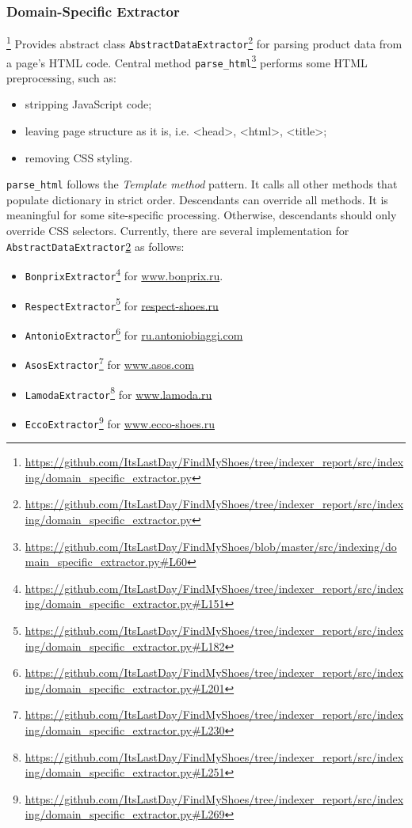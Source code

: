 \subsubsection{Domain-Specific Extractor}
    \footnote{\url{https://github.com/ItsLastDay/FindMyShoes/tree/indexer_report/src/indexing/domain_specific_extractor.py}}
    Provides abstract class \texttt{AbstractDataExtractor}\footnote{\label{AbstractDataExtractor}\url{https://github.com/ItsLastDay/FindMyShoes/tree/indexer_report/src/indexing/domain_specific_extractor.py}} for parsing product data from a page's HTML code. Central method \texttt{parse\_html}\footnote{\url{https://github.com/ItsLastDay/FindMyShoes/blob/master/src/indexing/domain_specific_extractor.py\#L60}} performs some HTML preprocessing, such as:
    \begin{itemize}
        \item stripping JavaScript code;
        \item leaving page structure as it is, i.e. <head>, <html>, <title>;
        \item removing CSS styling.
    \end{itemize}
    \texttt{parse\_html} follows the \textit{Template method} pattern. It calls all other methods 
that populate dictionary in strict order. De\-scen\-dants can override all methods. It is meaningful for
    some site-specific processing. Otherwise, descendants should only override CSS selectors.
    Currently, there are several im\-ple\-men\-ta\-tion for \texttt{AbstractDataExtractor}\cref{AbstractDataExtractor} as follows:
    \begin{itemize}
        \item \texttt{BonprixExtractor}\footnote{\url{https://github.com/ItsLastDay/FindMyShoes/tree/indexer_report/src/indexing/domain_specific_extractor.py\#L151}} for \url{www.bonprix.ru}.
        
        \item \texttt{RespectExtractor}\footnote{\url{https://github.com/ItsLastDay/FindMyShoes/tree/indexer_report/src/indexing/domain_specific_extractor.py\#L182}} for \url{respect-shoes.ru}
    
        \item \texttt{AntonioExtractor}\footnote{\url{https://github.com/ItsLastDay/FindMyShoes/tree/indexer_report/src/indexing/domain_specific_extractor.py\#L201}} for \url{ru.antoniobiaggi.com}
        
        \item \texttt{AsosExtractor}\footnote{\url{https://github.com/ItsLastDay/FindMyShoes/tree/indexer_report/src/indexing/domain_specific_extractor.py\#L230}} for \url{www.asos.com}
        
        \item \texttt{LamodaExtractor}\footnote{\url{https://github.com/ItsLastDay/FindMyShoes/tree/indexer_report/src/indexing/domain_specific_extractor.py\#L251}} for \url{www.lamoda.ru}
        
        \item \texttt{EccoExtractor}\footnote{\url{https://github.com/ItsLastDay/FindMyShoes/tree/indexer_report/src/indexing/domain_specific_extractor.py\#L269}} for \url{www.ecco-shoes.ru}

    \end{itemize}
